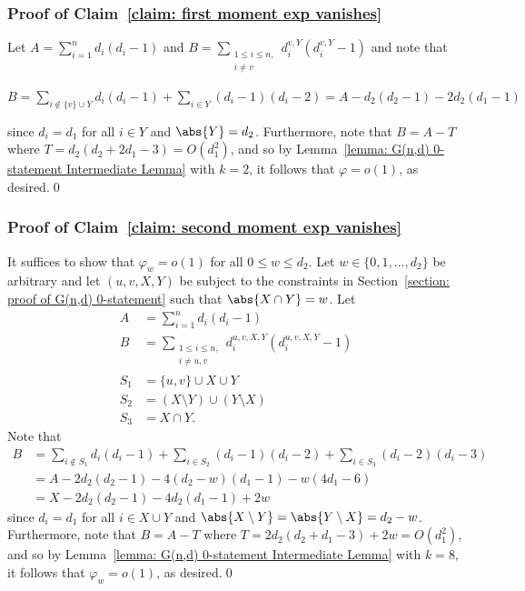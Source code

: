 \documentclass[12pt]{article}
\begin{document}
\subsubsection{Proof of Claim~\ref{claim: first moment exp vanishes}}

Let $A = \sum\limits_{i = 1}^{n} d_i(d_i-1)$ and $B = \sum\limits_{\substack{1\leq i\leq n,\\ i\neq v}} d^{v,Y}_i (d^{v,Y}_i-1)$ and note that
\begin{center}
    $B = \displaystyle\sum\limits_{i\notin\{v\}\cup Y} d_i(d_i-1) + \sum\limits_{i\in Y} (d_i-1)(d_i-2) = A - d_2(d_2-1) - 2d_2 (d_1-1)$
\end{center}
since $d_i = d_1$ for all $i\in Y$ and $\abs{Y} = d_2$. Furthermore, note that $B = A - T$ where $T = d_2 (d_2 + 2d_1 - 3) = O(d_1^2)$, and so by Lemma~\ref{lemma: G(n,d) 0-statement Intermediate Lemma} with $k = 2$, it follows that $\varphi = o(1)$, as desired.\qed

\subsubsection{Proof of Claim~\ref{claim: second moment exp vanishes}}

It suffices to show that $\varphi_w = o(1)$ for all $0\leq w\leq d_2$. Let $w\in\{0,1,\ldots,d_2\}$ be arbitrary and let $(u,v,X,Y)$ be subject to the constraints in Section~\ref{section: proof of G(n,d) 0-statement} such that $\abs{X\cap Y} = w$.
Let 
\begin{align*}
 A &= \sum\limits_{i = 1}^{n} d_i(d_i-1)\\  B &= \sum\limits_{\substack{1\leq i\leq n,\\ i\neq u,v}} d^{u,v,X,Y}_i (d^{u,v,X,Y}_i-1) \\
 S_1 &= \{u,v\}\cup X\cup Y\\
 S_2&= (X\setminus Y)\cup (Y\setminus X)\\
 S_3 &= X\cap Y.
\end{align*}
Note that
\begin{align*}
    B &= \sum\limits_{i\notin S_1} d_i(d_i-1) + \sum\limits_{i\in S_2} (d_i-1)(d_i-2) +\sum\limits_{i\in S_3} (d_i-2)(d_i-3)
    \\
    &= A - 2d_2(d_2-1) - 4(d_2-w) (d_1-1) - w(4d_1-6)
    \\
    &= X - 2d_2(d_2-1) - 4d_2(d_1-1) + 2w
\end{align*}
since $d_i = d_1$ for all $i\in X\cup Y$ and $\abs{X\setminus Y} = \abs{Y\setminus X} = d_2-w$. Furthermore, note that $B = A - T$ where $T = 2d_2 (d_2 + d_1 - 3) + 2w = O(d_1^2)$, and so by Lemma~\ref{lemma: G(n,d) 0-statement Intermediate Lemma} with $k = 8$, it follows that $\varphi_w = o(1)$, as desired.\qed
\end{document}
